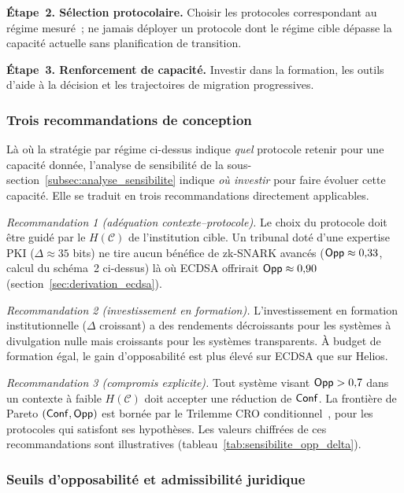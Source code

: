 \begin{sloppypar}
\textbf{\'Etape~2. S\'election protocolaire.} Choisir les protocoles
correspondant au r\'egime mesur\'e~; ne jamais d\'eployer un protocole
dont le r\'egime cible d\'epasse la capacit\'e actuelle sans planification
de transition.

\textbf{\'Etape~3. Renforcement de capacit\'e.} Investir dans la formation,
les outils d'aide \`a la d\'ecision et les trajectoires de migration progressives.

\subsubsection{Trois recommandations de conception}
\label{subsubsec:trois_recommandations}

L\`a o\`u la strat\'egie par r\'egime ci-dessus indique \emph{quel}
protocole retenir pour une capacit\'e donn\'ee, l'analyse de sensibilit\'e
de la sous-section~\ref{subsec:analyse_sensibilite} indique \emph{o\`u
investir} pour faire \'evoluer cette capacit\'e. Elle se traduit en trois
recommandations directement applicables.

\noindent\textit{Recommandation 1 (ad\'equation contexte--protocole).} Le
choix du protocole doit \^etre guid\'e par le $H(\mathcal{C})$ de
l'institution cible. Un tribunal dot\'e d'une expertise PKI ($\Delta \approx 35$ bits) ne
tire aucun b\'en\'efice de zk-SNARK avanc\'es ($\mathsf{Opp} \approx 0{,}33$, calcul du
sch\'ema~2 ci-dessus) l\`a o\`u ECDSA offrirait $\mathsf{Opp} \approx 0{,}90$
(section~\ref{sec:derivation_ecdsa}).

\noindent\textit{Recommandation 2 (investissement en formation).}
L'investissement en formation institutionnelle ($\Delta$ croissant) a des
rendements d\'ecroissants pour les syst\`emes \`a divulgation nulle mais
croissants pour les syst\`emes transparents. \`A budget de formation
\'egal, le gain d'opposabilit\'e est plus \'elev\'e sur ECDSA que sur Helios.

\noindent\textit{Recommandation 3 (compromis explicite).} Tout syst\`eme
visant $\mathsf{Opp} > 0{,}7$ dans un contexte \`a faible $H(\mathcal{C})$ doit
accepter une r\'eduction de $\mathsf{Conf}$. La fronti\`ere de Pareto
$(\mathsf{Conf}, \mathsf{Opp})$ est born\'ee par le Trilemme CRO
conditionnel~\cite{MINKA2026CRO}, pour les protocoles qui satisfont ses
hypoth\`eses. Les valeurs chiffr\'ees de ces recommandations sont
illustratives (tableau~\ref{tab:sensibilite_opp_delta}).

\subsubsection{Seuils d'opposabilit\'e et admissibilit\'e juridique}
\label{subsubsec:seuils_opposabilite}


\end{sloppypar}
